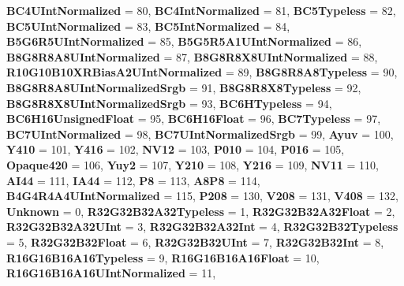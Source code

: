 \begin{DoxyCompactItemize}
{\bfseries B\+C4\+U\+Int\+Normalized} = 80, 
{\bfseries B\+C4\+Int\+Normalized} = 81, 
\newline
{\bfseries B\+C5\+Typeless} = 82, 
{\bfseries B\+C5\+U\+Int\+Normalized} = 83, 
{\bfseries B\+C5\+Int\+Normalized} = 84, 
{\bfseries B5\+G6\+R5\+U\+Int\+Normalized} = 85, 
\newline
{\bfseries B5\+G5\+R5\+A1\+U\+Int\+Normalized} = 86, 
{\bfseries B8\+G8\+R8\+A8\+U\+Int\+Normalized} = 87, 
{\bfseries B8\+G8\+R8\+X8\+U\+Int\+Normalized} = 88, 
{\bfseries R10\+G10\+B10\+X\+R\+Bias\+A2\+U\+Int\+Normalized} = 89, 
\newline
{\bfseries B8\+G8\+R8\+A8\+Typeless} = 90, 
{\bfseries B8\+G8\+R8\+A8\+U\+Int\+Normalized\+Srgb} = 91, 
{\bfseries B8\+G8\+R8\+X8\+Typeless} = 92, 
{\bfseries B8\+G8\+R8\+X8\+U\+Int\+Normalized\+Srgb} = 93, 
\newline
{\bfseries B\+C6\+H\+Typeless} = 94, 
{\bfseries B\+C6\+H16\+Unsigned\+Float} = 95, 
{\bfseries B\+C6\+H16\+Float} = 96, 
{\bfseries B\+C7\+Typeless} = 97, 
\newline
{\bfseries B\+C7\+U\+Int\+Normalized} = 98, 
{\bfseries B\+C7\+U\+Int\+Normalized\+Srgb} = 99, 
{\bfseries Ayuv} = 100, 
{\bfseries Y410} = 101, 
\newline
{\bfseries Y416} = 102, 
{\bfseries N\+V12} = 103, 
{\bfseries P010} = 104, 
{\bfseries P016} = 105, 
\newline
{\bfseries Opaque420} = 106, 
{\bfseries Yuy2} = 107, 
{\bfseries Y210} = 108, 
{\bfseries Y216} = 109, 
\newline
{\bfseries N\+V11} = 110, 
{\bfseries A\+I44} = 111, 
{\bfseries I\+A44} = 112, 
{\bfseries P8} = 113, 
\newline
{\bfseries A8\+P8} = 114, 
{\bfseries B4\+G4\+R4\+A4\+U\+Int\+Normalized} = 115, 
{\bfseries P208} = 130, 
{\bfseries V208} = 131, 
\newline
{\bfseries V408} = 132, 
{\bfseries Unknown} = 0, 
{\bfseries R32\+G32\+B32\+A32\+Typeless} = 1, 
{\bfseries R32\+G32\+B32\+A32\+Float} = 2, 
\newline
{\bfseries R32\+G32\+B32\+A32\+U\+Int} = 3, 
{\bfseries R32\+G32\+B32\+A32\+Int} = 4, 
{\bfseries R32\+G32\+B32\+Typeless} = 5, 
{\bfseries R32\+G32\+B32\+Float} = 6, 
\newline
{\bfseries R32\+G32\+B32\+U\+Int} = 7, 
{\bfseries R32\+G32\+B32\+Int} = 8, 
{\bfseries R16\+G16\+B16\+A16\+Typeless} = 9, 
{\bfseries R16\+G16\+B16\+A16\+Float} = 10, 
\newline
{\bfseries R16\+G16\+B16\+A16\+U\+Int\+Normalized} = 11, 

\end{DoxyCompactItemize}
